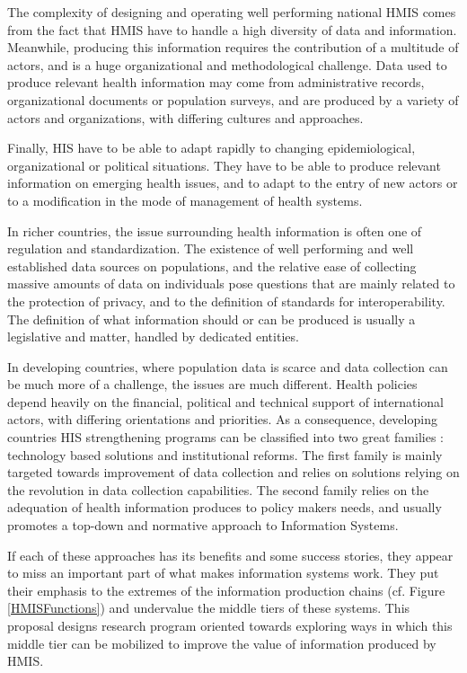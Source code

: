 \documentclass[a4paper,11pt,draft,twoside]{article}
\begin{document}
The complexity of designing and operating well performing national HMIS comes from the fact that HMIS have to handle a high diversity of data and information. Meanwhile, producing this information requires the contribution of a multitude of actors, and is a huge organizational and methodological challenge. Data used to produce relevant health information may come from administrative records, organizational documents or population surveys, and are produced by a variety of actors and organizations, with differing cultures and approaches.

Finally, HIS have to be able to adapt rapidly to changing epidemiological, organizational or political situations. They have to be able to produce relevant information on emerging health issues, and to adapt to the entry of new actors or to a modification in the mode of management of health systems.

In richer countries, the issue surrounding health information is often one of regulation and standardization. The  existence of well performing and well established data sources on populations, and the relative ease of collecting massive amounts of data on individuals pose questions that are mainly related to the protection of privacy, and to the definition of standards for interoperability. The definition of what information should or can be produced is usually a legislative and matter, handled by dedicated entities.

In developing countries, where population data is scarce and data collection can be much more of a challenge, the issues are much different. Health policies depend heavily on the financial, political and technical support of international actors, with differing orientations and priorities. As a consequence, developing countries HIS strengthening programs can be classified into two great families : technology based solutions and institutional reforms. The first family is mainly targeted towards improvement of data collection and relies on solutions relying on the revolution in  data collection capabilities. The second family relies on the adequation of health information produces to policy makers needs, and usually promotes a top-down and normative approach to Information Systems.

If each of these approaches has its benefits and some success stories,  they appear to miss an important part of what makes information systems work. They put their emphasis to the extremes of the information production chains (cf. Figure \ref{HMISFunctions}) and undervalue the middle tiers of these systems. This proposal designs research program oriented towards exploring ways in which this middle tier can be mobilized to improve the value of information produced by HMIS.
\end{document}
